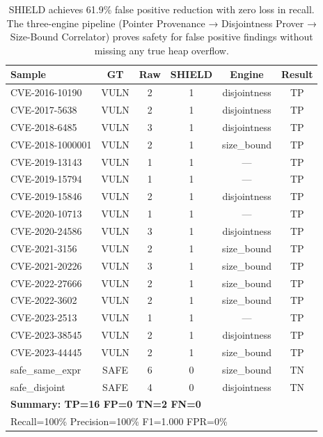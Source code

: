 \begin{table}[t]
\vspace{6pt}

\begin{subtable}{\textwidth}
\centering
\caption{Per-Sample Detection Results}
\label{tab:per_sample}
\begin{tabular}{lccccc}
\toprule
\textbf{Sample} & \textbf{GT} & \textbf{Raw} & \textbf{SHIELD} & \textbf{Engine} & \textbf{Result} \\
\midrule
CVE-2016-10190 & VULN & 2 & 1 & disjointness & TP \\
CVE-2017-5638  & VULN & 2 & 1 & disjointness & TP \\
CVE-2018-6485  & VULN & 3 & 1 & disjointness & TP \\
CVE-2018-1000001 & VULN & 2 & 1 & size\_bound & TP \\
CVE-2019-13143 & VULN & 1 & 1 & — & TP \\
CVE-2019-15794 & VULN & 1 & 1 & — & TP \\
CVE-2019-15846 & VULN & 2 & 1 & disjointness & TP \\
CVE-2020-10713 & VULN & 1 & 1 & — & TP \\
CVE-2020-24586 & VULN & 3 & 1 & disjointness & TP \\
CVE-2021-3156  & VULN & 2 & 1 & size\_bound & TP \\
CVE-2021-20226 & VULN & 3 & 1 & size\_bound & TP \\
CVE-2022-27666 & VULN & 2 & 1 & size\_bound & TP \\
CVE-2022-3602  & VULN & 2 & 1 & size\_bound & TP \\
CVE-2023-2513  & VULN & 1 & 1 & — & TP \\
CVE-2023-38545 & VULN & 2 & 1 & disjointness & TP \\
CVE-2023-44445 & VULN & 2 & 1 & size\_bound & TP \\
safe\_same\_expr & SAFE & 6 & 0 & size\_bound & TN \\
safe\_disjoint  & SAFE & 4 & 0 & disjointness & TN \\
\midrule
\multicolumn{6}{l}{\textbf{Summary: TP=16 FP=0 TN=2 FN=0}} \\
\multicolumn{6}{l}{Recall=100\% Precision=100\% F1=1.000 FPR=0\%} \\
\bottomrule
\end{tabular}
\end{subtable}

\vspace{6pt}
\caption*{\small SHIELD achieves 61.9\% false positive reduction with zero loss in recall. The three-engine pipeline (Pointer Provenance → Disjointness Prover → Size-Bound Correlator) proves safety for false positive findings without missing any true heap overflow.}
\end{table}
